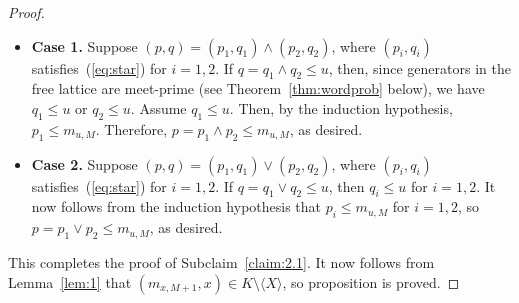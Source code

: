 \begin{proof}
\begin{itemize}
\item {\bf Case 1.} Suppose $(p, q) = (p_1, q_1) \wedge (p_2, q_2)$, where 
  $(p_i, q_i)$ satisfies~(\ref{eq:star}) for $i = 1, 2$.    
  If $q= q_1 \wedge q_2 \leqslant u$, then, since generators in the free lattice are meet-prime (see Theorem~\ref{thm:wordprob} below), we have $q_1\leqslant u$ or $q_2\leqslant u$. Assume $q_1\leqslant u$.  Then, by the induction hypothesis, $p_1\leqslant m_{u, M}$.  Therefore, $p = p_1\wedge p_2 \leqslant m_{u, M}$, as desired.

\item {\bf Case 2.} Suppose $(p, q) = (p_1, q_1) \vee (p_2, q_2)$, where 
  $(p_i, q_i)$ satisfies~(\ref{eq:star}) for $i = 1, 2$.    
  If $q= q_1 \vee q_2 \leqslant u$, then 
  $q_i \leqslant u$ for $i = 1, 2$.
  It now follows from the induction hypothesis that $p_i\leqslant m_{u, M}$ for $i = 1, 2$, so 
  $p = p_1 \vee p_2 \leqslant m_{u, M}$, as desired.
\end{itemize}
This completes the proof of Subclaim~\ref{claim:2.1}. It now follows from Lemma~\ref{lem:1} that 
$(m_{x, M+1}, x)\in K \setminus \langle X \rangle$, so proposition is proved.
\end{proof}

